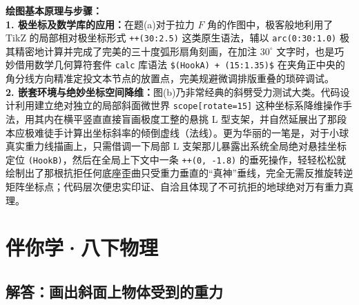 \documentclass[12pt, a4paper]{ctexrep}
\begin{document}
\vspace{0.6cm}

{\small\color{blue!70!black}
\textbf{绘图基本原理与步骤：}\\
\textbf{1. 极坐标及数学库的应用：}在题(a)对于拉力 $F$ 角的作图中，极客般地利用了 TikZ 的局部相对极坐标形式 \texttt{++(30:2.5)} 这类原生语法，辅以 \texttt{arc(0:30:1.0)} 极其精密地计算并完成了完美的三十度弧形扇角刻画，在加注 $30^\circ$ 文字时，也是巧妙借用数学几何算符套件 \texttt{calc} 库语法 \texttt{\$(HookA) + (15:1.35)\$} 在夹角正中央的角分线方向精准定投文本节点的放置点，完美规避微调排版重叠的琐碎调试。\\
\textbf{2. 嵌套环境与绝妙坐标空间降维：}图(b)乃非常经典的斜劈受力测试大类。代码设计利用建立绝对独立的局部斜面微世界 \texttt{scope[rotate=15]} 这种坐标系降维操作手法，用其内在横平竖直直接盲画极度工整的悬挑 L 型支架，并自然延展出了那段本应极难徒手计算出坐标斜率的倾倒虚线（法线）。更为华丽的一笔是，对于小球真实重力线描画上，只需借调一下局部 L 支架那儿暴露出系统全局绝对悬挂坐标定位 \texttt{(HookB)}，然后在全局上下文中一条 \texttt{++(0, -1.8)} 的垂死操作，轻轻松松就绘制出了那根抗拒任何底座歪曲只受重力垂直的“真神”垂线，完全无需反推旋转逆矩阵坐标点；代码层次便忠实印证、自洽且体现了不可抗拒的地球绝对万有重力真理。
}


\chapter{伴你学·八下物理}


\section{解答：画出斜面上物体受到的重力}

\vspace{0.6cm}
\end{document}
